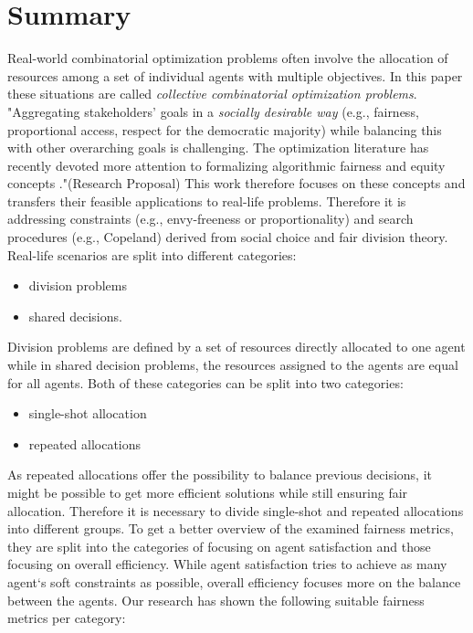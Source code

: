 \documentclass[german, a4paper, 11pt, oneside]{scrbook}
\begin{document}
\chapter{Summary}
Real-world combinatorial optimization problems often involve the allocation of resources among a set of individual agents with multiple objectives.
In this paper these situations are called \emph{collective combinatorial optimization problems}. 
"Aggregating stakeholders' goals in a \emph{socially desirable way} (e.g., fairness, proportional access, respect for the democratic majority) while balancing this with other overarching goals is challenging. The optimization literature has recently devoted more attention to formalizing algorithmic fairness and equity concepts \cite{XinyingChen.2023}."(Research Proposal) This work therefore focuses on these concepts and transfers their feasible applications to real-life problems. Therefore it is addressing constraints (e.g., envy-freeness or proportionality) and search procedures (e.g., Copeland) derived from social choice and fair division theory. \\Real-life scenarios are split into different categories: 
 \begin{itemize}
\item division problems 
\item shared decisions. 
\end{itemize}
Division problems are defined by a set of resources directly allocated to one agent while in shared decision problems, the resources assigned to the agents are equal for all agents. Both of these categories can be split into two categories:
\begin{itemize}
\item single-shot allocation
\item repeated allocations
\end{itemize} 
As repeated allocations offer the possibility to balance previous decisions, it might be possible to get more efficient solutions while still ensuring fair allocation. Therefore it is necessary to divide single-shot and repeated allocations into different groups. To get a better overview of the examined fairness metrics, they are split into the categories of focusing on agent satisfaction and those focusing on overall efficiency. While agent satisfaction tries to achieve as many agent`s soft constraints as possible, overall efficiency focuses more on the balance between the agents.
Our research has shown the following suitable fairness metrics per category:
\\\\
\end{document}
